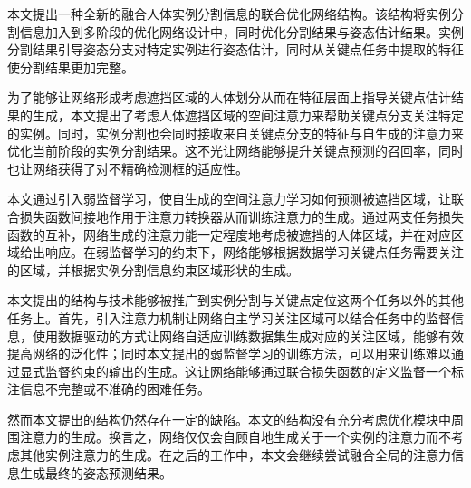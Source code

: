 \begin{conclusion}
	
本文提出一种全新的融合人体实例分割信息的联合优化网络结构。该结构将实例分割信息加入到多阶段的优化网络设计中，同时优化分割结果与姿态估计结果。实例分割结果引导姿态分支对特定实例进行姿态估计，同时从关键点任务中提取的特征使分割结果更加完整。

为了能够让网络形成考虑遮挡区域的人体划分从而在特征层面上指导关键点估计结果的生成，本文提出了考虑人体遮挡区域的空间注意力来帮助关键点分支关注特定的实例。同时，实例分割也会同时接收来自关键点分支的特征与自生成的注意力来优化当前阶段的实例分割结果。这不光让网络能够提升关键点预测的召回率，同时也让网络获得了对不精确检测框的适应性。

本文通过引入弱监督学习，使自生成的空间注意力学习如何预测被遮挡区域，让联合损失函数间接地作用于注意力转换器从而训练注意力的生成。通过两支任务损失函数的互补，网络生成的注意力能一定程度地考虑被遮挡的人体区域，并在对应区域给出响应。在弱监督学习的约束下，网络能够根据数据学习关键点任务需要关注的区域，并根据实例分割信息约束区域形状的生成。

本文提出的结构与技术能够被推广到实例分割与关键点定位这两个任务以外的其他任务上。首先，引入注意力机制让网络自主学习关注区域可以结合任务中的监督信息，使用数据驱动的方式让网络自适应训练数据集生成对应的关注区域，能够有效提高网络的泛化性；同时本文提出的弱监督学习的训练方法，可以用来训练难以通过显式监督约束的输出的生成。这让网络能够通过联合损失函数的定义监督一个标注信息不完整或不准确的困难任务。

然而本文提出的结构仍然存在一定的缺陷。本文的结构没有充分考虑优化模块中周围注意力的生成。换言之，网络仅仅会自顾自地生成关于一个实例的注意力而不考虑其他实例注意力的生成。在之后的工作中，本文会继续尝试融合全局的注意力信息生成最终的姿态预测结果。

\end{conclusion}